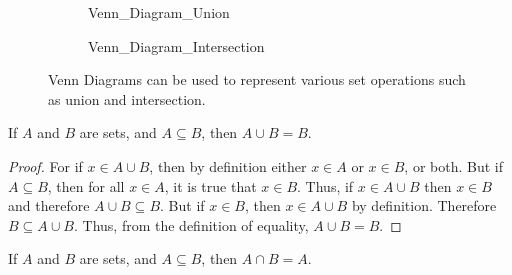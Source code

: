 \documentclass[crop=false,class=book,oneside]{standalone}
\begin{document}
            \begin{figure}[H]
                \captionsetup{type=figure}
                \centering
                \begin{subfigure}[b]{0.49\textwidth}
                    \captionsetup{type=figure}
                    \centering
                    {Venn_Diagram_Union}
                    \label{fig:Elem_Alg_Union_Venn_Diagram}
                \end{subfigure}
                \begin{subfigure}[b]{0.49\textwidth}
                    \captionsetup{type=figure}
                    \centering
                    
                              {Venn_Diagram_Intersection}
                    \label{fig:Elem_Alg_Intersection_Venn_diagram}
                \end{subfigure}
                \caption[Venn Diagrams for Union and Intersection]
                        {Venn Diagrams can be used to represent
                         various set operations such as union
                         and intersection.}
                \label{fig:Elem_Alg_Venn_Diagram}
            \end{figure}
            \begin{theorem}
                \label{thm:Elem_Alg_Union_of_Subset}
                If $A$ and $B$ are sets, and $A\subseteq{B}$,
                then $A\cup{B}=B$.
            \end{theorem}
            \begin{proof}
                For if $x\in{A\cup{B}}$, then by definition
                either $x\in{A}$ or $x\in{B}$, or both. But
                if $A\subseteq{B}$, then for all $x\in{A}$, it is
                true that $x\in{B}$. Thus, if $x\in{A}\cup{B}$
                then $x\in{B}$ and therefore
                $A\cup{B}\subseteq{B}$. But if $x\in{B}$, then
                $x\in{A}\cup{B}$ by definition. Therefore
                $B\subseteq{A}\cup{B}$. Thus, from the definition
                of equality, $A\cup{B}=B$.
            \end{proof}
            \begin{theorem}
                \label{thm:Elem_Alg_Intersection_of_Subset}
                If $A$ and $B$ are sets, and $A\subseteq{B}$,
                then $A\cap{B}=A$.
            \end{theorem}
\end{document}
